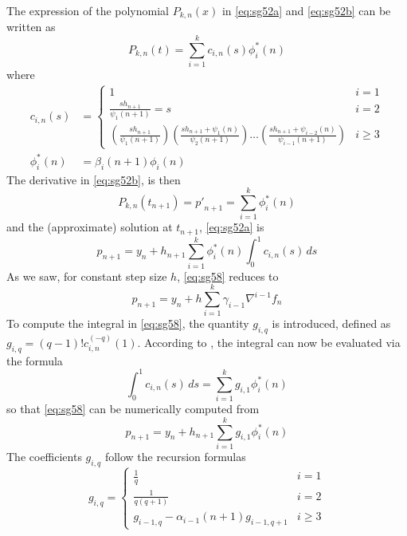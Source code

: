 The expression of the polynomial $P_{k,n}(x)$ in \autoref{eq:sg52a} and \autoref{eq:sg52b} 
can be written as
\begin{equation}\label{eq:sq57}
  P_{k,n}(t) = \sum_{i=1}^{k} c_{i,n} (s) \phi ^{*}_{i}(n)
\end{equation}
where
\begin{align}
  c_{i,n}(s) &= \begin{cases}
    1                                    & i=1 \\
    \frac{s h_{n+1}}{\psi _1 (n+1)} = s  & i=2 \\
    \left(\frac{sh_{n+1}}{\psi _1(n+1)}\right)
    \left(\frac{sh_{n+1} + \psi _1(n)}{\psi _2(n+1)}\right)
    \dots
    \left(\frac{sh_{n+1} + \psi _{i-2}(n)}{\psi _{i-1}(n+1)}\right) & i \ge 3
  \end{cases}
  \label{eq:sg56} \\
  \phi ^{*}_{i}(n) &= \beta _i (n+1) \phi _i (n) \label{eq:sg56b}
\end{align}
The derivative in \autoref{eq:sg52b}, is then
\begin{equation}\label{eq:sg57b}
   P_{k,n}(t_{n+1}) = {p'}_{n+1} = \sum_{i=1}^{k} \phi ^{*}_{i}(n)
\end{equation}
and the (approximate) solution at $t_{n+1}$, \autoref{eq:sg52a} is
\begin{equation}\label{eq:sg58}
  p_{n+1} = y_n + h_{n+1} \sum_{i=1}^{k} \phi ^{*}_{i}(n) \int_{0}^{1} c_{i,n}(s) \,ds
\end{equation}
As we saw, for constant step size $h$, \autoref{eq:sg58} reduces to
\begin{equation}\label{eq:sg58b}
  p_{n+1} = y_n + h \sum_{i=1}^{k} \gamma _{i-1} \nabla ^{i-1} f_n 
\end{equation}
To compute the integral in \autoref{eq:sg58}, the quantity $g_{i,q}$ is 
introduced, defined as $g_{i,q} = (q-1)! c_{i,n}^{(-q)}(1)$. According to 
\cite{Shampine1975}, the integral can now be evaluated via the formula
\begin{equation}
    \int_{0}^{1} c_{i,n}(s) \,ds = \sum_{i=1}^{k} g_{i,1} \phi ^{*}_{i}(n)
\end{equation}
so that \autoref{eq:sg58} can be numerically computed from
\begin{equation}\label{eq:sg511}
  p_{n+1} = y_n + h_{n+1}  \sum_{i=1}^{k} g_{i,1} \phi ^{*}_{i}(n)
\end{equation}
The coefficients $g_{i,q}$ follow the recursion formulas
\begin{equation}\label{eq:sg510}
  g_{i,q} = \begin{cases}
    \frac{1}{q} & i=1 \\
    \frac{1}{q(q+1)} & i=2 \\
    g_{i-1,q} - \alpha _{i-1}(n+1) g_{i-1,q+1} & i \ge 3
  \end{cases}
\end{equation}

